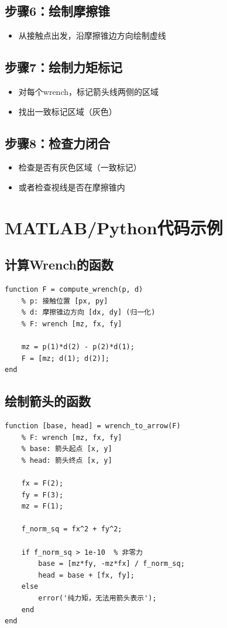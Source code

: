 \documentclass[12pt,a4paper]{article}
\begin{document}
\subsection{步骤6：绘制摩擦锥}
\begin{itemize}
\item 从接触点出发，沿摩擦锥边方向绘制虚线
\end{itemize}

\subsection{步骤7：绘制力矩标记}
\begin{itemize}
\item 对每个wrench，标记箭头线两侧的区域
\item 找出一致标记区域（灰色）
\end{itemize}

\subsection{步骤8：检查力闭合}
\begin{itemize}
\item 检查是否有灰色区域（一致标记）
\item 或者检查视线是否在摩擦锥内
\end{itemize}

\section{MATLAB/Python代码示例}

\subsection{计算Wrench的函数}

\begin{verbatim}
function F = compute_wrench(p, d)
    % p: 接触位置 [px, py]
    % d: 摩擦锥边方向 [dx, dy] (归一化)
    % F: wrench [mz, fx, fy]
    
    mz = p(1)*d(2) - p(2)*d(1);
    F = [mz; d(1); d(2)];
end
\end{verbatim}

\subsection{绘制箭头的函数}

\begin{verbatim}
function [base, head] = wrench_to_arrow(F)
    % F: wrench [mz, fx, fy]
    % base: 箭头起点 [x, y]
    % head: 箭头终点 [x, y]
    
    fx = F(2);
    fy = F(3);
    mz = F(1);
    
    f_norm_sq = fx^2 + fy^2;
    
    if f_norm_sq > 1e-10  % 非零力
        base = [mz*fy, -mz*fx] / f_norm_sq;
        head = base + [fx, fy];
    else
        error('纯力矩，无法用箭头表示');
    end
end
\end{verbatim}
\end{document}
